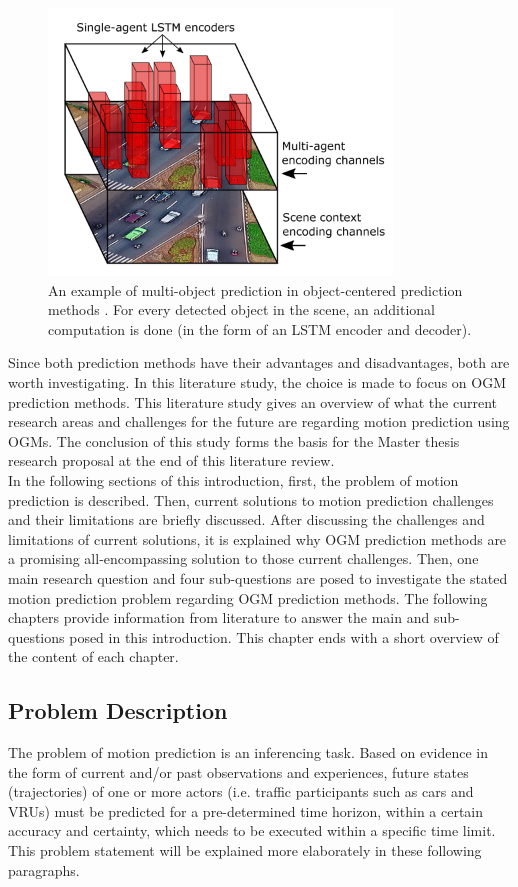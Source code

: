 \begin{figure}[h]
	\centering
	\includegraphics[width=0.4\linewidth]{Figures/Introduction/Multi-agent_obj_cent}
	\caption{An example of multi-object prediction in object-centered prediction methods \cite{zhao2019multi}. For every detected object in the scene, an additional computation is done (in the form of an LSTM encoder and decoder).}
	\label{fig:obj_comp}
\end{figure}

Since both prediction methods have their advantages and disadvantages, both are worth investigating. In this literature study, the choice is made to focus on \gls{OGM} prediction methods. This literature study gives an overview of what the current research areas and challenges for the future are regarding motion prediction using \glspl{OGM}. The conclusion of this study forms the basis for the Master thesis research proposal at the end of this literature review. \\

In the following sections of this introduction, first, the problem of motion prediction is described. Then, current solutions to motion prediction challenges and their limitations are briefly discussed. After discussing the challenges and limitations of current solutions, it is explained why \gls{OGM} prediction methods are a promising all-encompassing solution to those current challenges. Then, one main research question and four sub-questions are posed to investigate the stated motion prediction problem regarding \gls{OGM} prediction methods. The following chapters provide information from literature to answer the main and sub-questions posed in this introduction. This chapter ends with a short overview of the content of each chapter.

\subsection{Problem Description} 
The problem of motion prediction is an inferencing task. Based on evidence in the form of current and/or past observations and experiences, future states (trajectories) of one or more actors (i.e. traffic participants such as cars and \glspl{VRU}) must be predicted for a pre-determined time horizon, within a certain accuracy and certainty, which needs to be executed within a specific time limit. This problem statement will be explained more elaborately in these following paragraphs. \\

